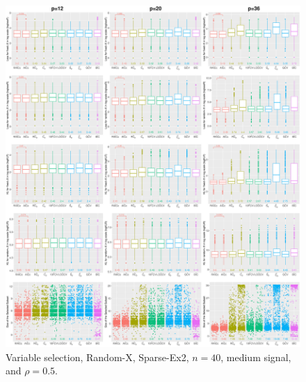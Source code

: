 \begin{figure}[!ht]
\centering
\includegraphics[width=\textwidth]{figures/supplement/randomx/subset_selection/Sparse-Ex2_n40_msnr_rho05.eps}
\caption{Variable selection, Random-X, Sparse-Ex2, $n=40$, medium signal, and $\rho=0.5$.}
\end{figure}
\clearpage
